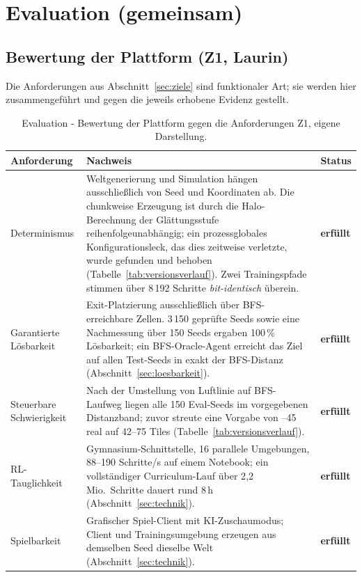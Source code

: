 \documentclass[11pt,a4paper]{article}
\let\sfOldSection\section
\renewcommand{\section}{\clearpage\sfOldSection}
\begin{document}
\section{Evaluation (gemeinsam)}
\label{sec:evaluation}
\subsection{Bewertung der Plattform (Z1, Laurin)}
\label{sec:evalplattform}

Die Anforderungen aus Abschnitt~\ref{sec:ziele} sind funktionaler Art; sie
werden hier zusammengeführt und gegen die jeweils erhobene Evidenz gestellt.

\begin{table}[h]
\centering
\small
\begin{tabular}{@{}L{3.3cm}L{7.4cm}L{2.0cm}@{}}
\toprule
\textbf{Anforderung} & \textbf{Nachweis} & \textbf{Status} \\
\midrule
Determinismus
  & Weltgenerierung und Simulation hängen ausschließlich von Seed und
    Koordinaten ab. Die chunkweise Erzeugung ist durch die Halo-Berechnung der
    Glättungsstufe reihenfolgeunabhängig; ein prozessglobales Konfigurationsleck,
    das dies zeitweise verletzte, wurde gefunden und behoben
    (Tabelle~\ref{tab:versionsverlauf}). Zwei Trainingspfade stimmen über
    8\,192 Schritte \emph{bit-identisch} überein.
  & \textbf{erfüllt} \\
\addlinespace
Garantierte Lösbarkeit
  & Exit-Platzierung ausschließlich über BFS-erreichbare Zellen. 3\,150 geprüfte
    Seeds sowie eine Nachmessung über 150 Seeds ergaben 100\,\% Lösbarkeit; ein
    BFS-Oracle-Agent erreicht das Ziel auf allen Test-Seeds in exakt der
    BFS-Distanz (Abschnitt~\ref{sec:loesbarkeit}).
  & \textbf{erfüllt} \\
\addlinespace
Steuerbare Schwierigkeit
  & Nach der Umstellung von Luftlinie auf BFS-Laufweg liegen alle 150
    Eval-Seeds im vorgegebenen Distanzband; zuvor streute eine Vorgabe von
    --45\grqq{} real auf 42--75 Tiles (Tabelle~\ref{tab:versionsverlauf}).
  & \textbf{erfüllt} \\
\addlinespace
RL-Tauglichkeit
  & Gymnasium-Schnittstelle, 16 parallele Umgebungen, 88--190 Schritte/s auf
    einem Notebook; ein vollständiger Curriculum-Lauf über 2{,}2\,Mio.\ Schritte
    dauert rund 8\,h (Abschnitt~\ref{sec:technik}).
  & \textbf{erfüllt} \\
\addlinespace
Spielbarkeit
  & Grafischer Spiel-Client mit KI-Zuschaumodus; Client und Trainingsumgebung
    erzeugen aus demselben Seed dieselbe Welt
    (Abschnitt~\ref{sec:technik}).
  & \textbf{erfüllt} \\
\bottomrule
\end{tabular}
\caption[Bewertung der Plattform gegen die Anforderungen Z1]{Evaluation -
Bewertung der Plattform gegen die Anforderungen Z1, eigene Darstellung.}
\label{tab:z1}
\end{table}
\end{document}
